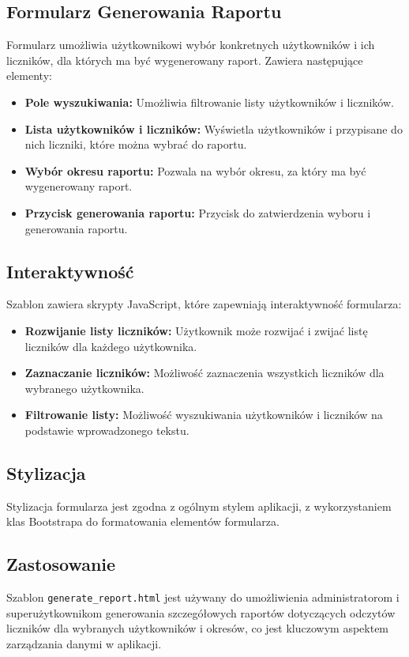 \documentclass[12pt,a4paper]{report}
\begin{document}
\subsection{Formularz Generowania Raportu}
Formularz umożliwia użytkownikowi wybór konkretnych użytkowników i ich liczników, dla których ma być wygenerowany raport. Zawiera następujące elementy:
\begin{itemize}
\item \textbf{Pole wyszukiwania:} Umożliwia filtrowanie listy użytkowników i liczników.
\item \textbf{Lista użytkowników i liczników:} Wyświetla użytkowników i przypisane do nich liczniki, które można wybrać do raportu.
\item \textbf{Wybór okresu raportu:} Pozwala na wybór okresu, za który ma być wygenerowany raport.
\item \textbf{Przycisk generowania raportu:} Przycisk do zatwierdzenia wyboru i generowania raportu.
\end{itemize}

\subsection{Interaktywność}
Szablon zawiera skrypty JavaScript, które zapewniają interaktywność formularza:
\begin{itemize}
\item \textbf{Rozwijanie listy liczników:} Użytkownik może rozwijać i zwijać listę liczników dla każdego użytkownika.
\item \textbf{Zaznaczanie liczników:} Możliwość zaznaczenia wszystkich liczników dla wybranego użytkownika.
\item \textbf{Filtrowanie listy:} Możliwość wyszukiwania użytkowników i liczników na podstawie wprowadzonego tekstu.
\end{itemize}

\subsection{Stylizacja}
Stylizacja formularza jest zgodna z ogólnym stylem aplikacji, z wykorzystaniem klas Bootstrapa do formatowania elementów formularza.

\subsection{Zastosowanie}
Szablon \texttt{generate\_report.html} jest używany do umożliwienia administratorom i superużytkownikom generowania szczegółowych raportów dotyczących odczytów liczników dla wybranych użytkowników i okresów, co jest kluczowym aspektem zarządzania danymi w aplikacji.
\end{document}
